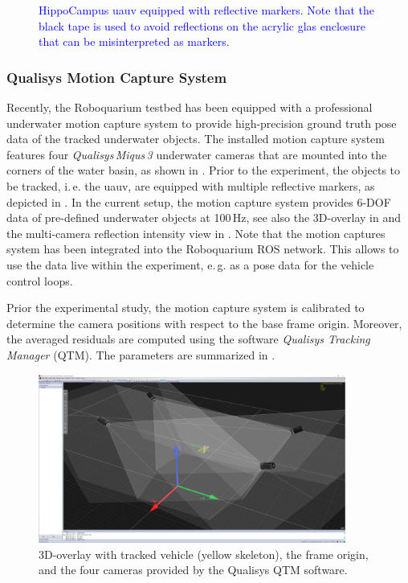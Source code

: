 \begin{figure}
    \centering
    
    \caption{\textcolor{blue}{HippoCampus \ac{uauv} equipped with reflective markers. Note that the black tape is used to avoid reflections on the acrylic glas enclosure that can be misinterpreted as markers.}}
    \label{fig:hippo_with_marker}
\end{figure}


\subsubsection*{Qualisys Motion Capture System}
Recently, the Roboquarium testbed has been equipped with a professional underwater motion capture system to provide high-precision ground truth pose data of the tracked underwater objects.
The installed motion capture system features four \textit{Qualisys\,Miqus\,3} underwater cameras that are mounted into the corners of the water basin, as shown in .
Prior to the experiment, the objects to be tracked, i.\,e. the \ac{uauv}, are equipped with multiple reflective markers, as depicted in . 
In the current setup, the motion capture system provides 6-DOF data of pre-defined underwater objects at 100\,Hz, see also the 3D-overlay in  and the multi-camera reflection intensity view in .
Note that the motion captures system has been integrated into the Roboquarium ROS network.
This allows to use the data live within the experiment, e.\,g. as a pose data for the vehicle control loops.

Prior the experimental study, the motion capture system is calibrated to determine the camera positions with respect to the base frame origin. 
Moreover, the averaged residuals are computed using the software \textit{Qualisys Tracking Manager} (QTM).
The parameters are summarized in .

\begin{figure}
    \centering
    \includegraphics[width=0.9\textwidth]{images/04/qtm_3d_overlay.png}
    \caption{3D-overlay with tracked vehicle (yellow skeleton), the frame origin, and the four cameras provided by the Qualisys QTM software.}
    \label{fig:qtm_3d}
\end{figure}

